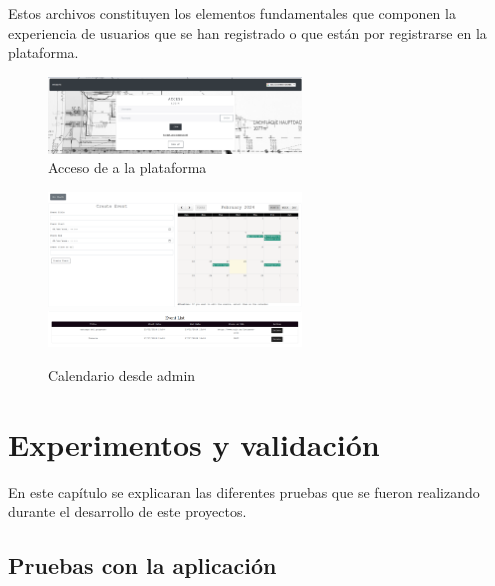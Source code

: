 \documentclass[a4paper, 12pt]{book}
\begin{document}
Estos archivos constituyen los elementos fundamentales que componen la experiencia de usuarios que se han registrado o que están por registrarse en la plataforma.
\begin{figure}
  \centering
  \includegraphics[width=0.6\textwidth]{img/acceso.png}
  \caption{Acceso de a la plataforma}
  \label{fig:adminacceso}
\end{figure}
\begin{figure}
  \centering
  \includegraphics[width=0.6\textwidth]{img/calendarioadmin.png}
  \includegraphics[width=0.6\textwidth]{img/calendarioadmin2.png}
  \caption{Calendario desde admin}
  \label{fig:admincal}
\end{figure}


\cleardoublepage
\chapter{Experimentos y validación}
\label{chap:experimentos}

En este capítulo se explicaran las diferentes pruebas que se fueron realizando durante el desarrollo de este proyectos.

\section{Pruebas con la aplicación}
\label{sec:pruebas}
\end{document}
